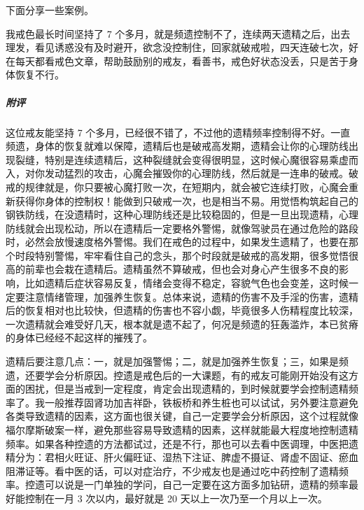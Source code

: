 下面分享一些案例。

\begin{case}
    我戒色最长时间坚持了 7 个多月，就是频遗控制不了，连续两天遗精之后，出去理发，看见诱惑没有及时避开，欲念没控制住，回家就破戒啦，四天连破七次，好在每天都看戒色文章，帮助鼓励别的戒友，看善书，戒色好状态没丢，只是苦于身体恢复不行。
    \subparagraph{附评} 这位戒友能坚持 7 个多月，已经很不错了，不过他的遗精频率控制得不好。一直频遗，身体的恢复就难以保障，遗精后也是破戒高发期，遗精会让你的心理防线出现裂缝，特别是连续遗精后，这种裂缝就会变得很明显，这时候心魔很容易乘虚而入，对你发动猛烈的攻击，心魔会摧毁你的心理防线，然后就是一连串的破戒。破戒的规律就是，你只要被心魔打败一次，在短期内，就会被它连续打败，心魔会重新获得你身体的控制权！能做到只破戒一次，也是相当不易。用觉悟构筑起自己的钢铁防线，在没遗精时，这种心理防线还是比较稳固的，但是一旦出现遗精，心理防线就会出现松动，所以在遗精后一定要格外警惕，就像驾驶员在通过危险的路段时，必然会放慢速度格外警惕。我们在戒色的过程中，如果发生遗精了，也要在那个时段特别警惕，牢牢看住自己的念头，那个时段就是破戒的高发期，很多觉悟很高的前辈也会栽在遗精后。遗精虽然不算破戒，但也会对身心产生很多不良的影响，比如遗精后症状容易反复，情绪会变得不稳定，容貌气色也会变差，这时候一定要注意情绪管理，加强养生恢复。总体来说，遗精的伤害不及手淫的伤害，遗精后的恢复相对也比较快，但遗精的伤害也不容小觑，毕竟很多人伤精程度比较深，一次遗精就会难受好几天，根本就是遗不起了，何况是频遗的狂轰滥炸，本已贫瘠的身体已经经不起这样的摧残了。

    遗精后要注意几点：一，就是加强警惕；二，就是加强养生恢复；三，如果是频遗，还要学会分析原因。控遗是戒色后的一大课题，有的戒友可能刚开始没有这方面的困扰，但是当戒到一定程度，肯定会出现遗精的，到时候就要学会控制遗精频率了。我一般推荐固肾功加吉祥卧，铁板桥和养生桩也可以试试，另外要注意避免各类导致遗精的因素，这方面也很关键，自己一定要学会分析原因，这个过程就像福尔摩斯破案一样，避免那些容易导致遗精的因素，这样就能最大程度地控制遗精频率。如果各种控遗的方法都试过，还是不行，那也可以去看中医调理，中医把遗精分为：君相火旺证、肝火偏旺证、湿热下注证、脾虚不摄证、肾虚不固证、瘀血阻滞证等。看中医的话，可以对症治疗，不少戒友也是通过吃中药控制了遗精频率。控遗可以说是一门单独的学问，自己一定要在这方面多加钻研，遗精的频率最好能控制在一月 3 次以内，最好就是 20 天以上一次乃至一个月以上一次。
\end{case}

